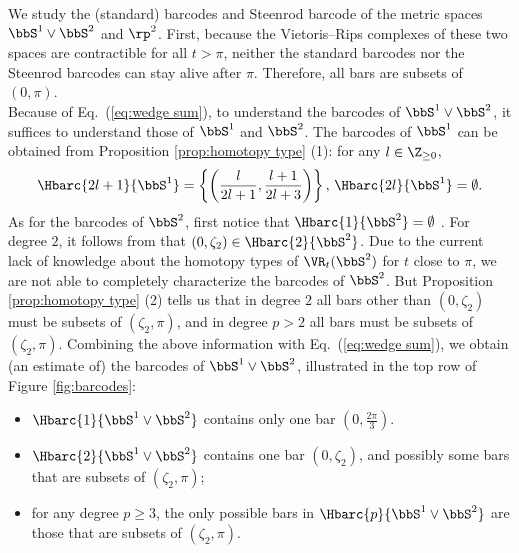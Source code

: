 \begin{example}
	We study the (standard) barcodes and Steenrod barcode of the metric spaces $\bbS^1\vee\bbS^2$ and $\rp^2$. First, because the Vietoris--Rips complexes of these two spaces are contractible for all $t>\pi$, neither the standard barcodes nor the Steenrod barcodes can stay alive after $\pi$. Therefore, all bars are subsets of $(0,\pi)$. \\

	Because of Eq.~(\ref{eq:wedge sum}), to understand the barcodes of $\bbS^1\vee\bbS^2$, it suffices to understand those of $\bbS^1$ and $\bbS^2$. The barcodes of $\bbS^1$ can be obtained from Proposition \ref{prop:homotopy type} (1): for any $l\in \Z_{\geq 0}$,
	\[\Hbarc{2l+1}{\bbS^1}=\left\{\left(\frac{l}{2l+1},\frac{l+1}{2l+3}\right)\right\},\, \Hbarc{2l}{\bbS^1}=\emptyset.\]
	As for the barcodes of $\bbS^2$, first notice that $\Hbarc{1}{\bbS^2}=\emptyset$ .  For degree $2$, it follows from \cite[Proposition 9.4]{lim2020vietoris} that $(0,\zeta_2)\in \Hbarc{2}{\bbS^2}$. Due to the current lack of knowledge about the homotopy types of $\VR_t(\bbS^2)$ for $ t$ close to $\pi$, we are not able to completely characterize the barcodes of $\bbS^2$. But Proposition \ref{prop:homotopy type} (2) tells us that in degree $2$ all bars other than $(0,\zeta_2)$ must be subsets  of $(\zeta_2,\pi)$, and in degree $p>2$ all bars must be subsets of $(\zeta_2,\pi)$. Combining the above information with Eq.~(\ref{eq:wedge sum}), we obtain (an estimate of) the barcodes of $\bbS^1\vee\bbS^2$, illustrated in the top row of Figure \ref{fig:barcodes}:
	\begin{itemize}
		\item $\Hbarc{1}{\bbS^1\vee \bbS^2}$ contains only one bar $(0,\frac{2\pi}{3})$.
		\item $\Hbarc{2}{\bbS^1\vee \bbS^2}$ contains one bar $(0,\zeta_2)$, and possibly some bars that are subsets of $(\zeta_2,\pi)$;
		\item for any degree $p\geq 3$, the only possible bars in $\Hbarc{p}{\bbS^1\vee \bbS^2}$ are those that are subsets of $(\zeta_2,\pi)$.
	\end{itemize}


\end{example}
